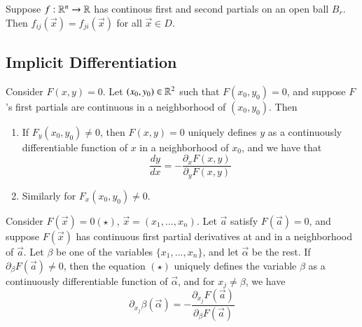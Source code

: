 \documentclass[12pt, a4paper, oneside, openright, titlepage]{book}
\begin{document}
\begin{appendices}
    \begin{thm}
        Suppose $f:\mathbb R^n\rightarrow \mathbb R$ has continous first and second partials on an open ball $B_r$. Then $f_{ij}(\vec{x}) = f_{ji}(\vec{x})$ for all $\vec{x} \in D$.
    \end{thm}


    \subsection{Implicit Differentiation}

    \begin{thm}
        Consider $F(x,y) = 0$. Let $(x_0,y_0) \in \mathbb R^2$ such that $F(x_0,y_0) = 0$, and suppose $F$'s first partials are continuous in a neighborhood of $(x_0,y_0)$. Then \begin{enumerate}
            \item If $F_y(x_0,y_0) \neq 0$, then $F(x,y) = 0$ uniquely defines $y$ as a continuously differentiable function of $x$ in a neighborhood of $x_0$, and we have that \begin{equation}
                    \frac{dy}{dx} = -\frac{\partial_x F(x,y)}{\partial_y F(x,y)}
                \end{equation}
            \item Similarly for $F_x(x_0,y_0) \neq 0$.
        \end{enumerate}
    \end{thm}


    \begin{thm}
        Consider $F(\vec{x}) = 0 (\star)$, $\vec{x} = (x_1,...,x_n)$. Let $\vec{a}$ satisfy $F(\vec{a}) = 0$, and suppose $F(\vec{x})$ has continuous first partial derivatives at and in a neighborhood of $\vec{a}$. Let $\beta$ be one of the variables $\{x_1,...,x_n\}$, and let $\vec{\alpha}$ be the rest. If $\partial_{\beta}F(\vec{a}) \neq 0$, then the equation $(\star)$ uniquely defines the variable $\beta$ as a continuously differentiable function of $\vec{\alpha}$, and for $x_j \neq \beta$, we have \begin{equation}
            \partial_{x_j}\beta(\vec{\alpha}) = -\frac{\partial_{x_j}F(\vec{a})}{\partial_{\beta}F(\vec{a})}
        \end{equation}
    \end{thm}



\end{appendices}
\end{document}
